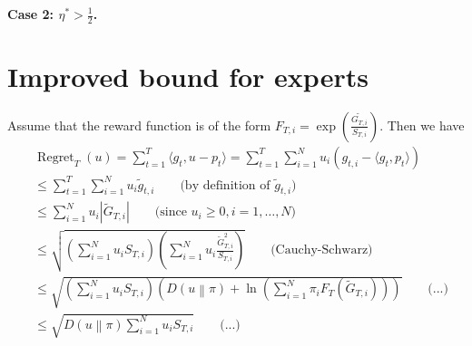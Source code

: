 \documentclass{colt2016_empty} %
\DeclareMathOperator{\Regret}{Regret}
\newcommand{\KL}[2]{D\left({#1}\middle\|{#2}\right)}  %
\begin{document}
\textbf{Case 2: $\eta^*>\frac{1}{2}$.}


\section{Improved bound for experts}

Assume that the reward function is of the form $F_{T,i}=\exp(\frac{\tilde{G_{T,i}}}{S_{T,i}})$. Then we have
\begin{align}
&\Regret_T(u)
= \sum_{t=1}^T \langle g_t, u - p_t \rangle
= \sum_{t=1}^T \sum_{i=1}^N u_i \left(g_{t,i} - \langle g_t, p_t \rangle \right) \\
& \le \sum_{t=1}^T \sum_{i=1}^N u_i \widetilde g_{t,i} \qquad \text{(by definition of $\widetilde g_{t,i}$)} \\
& \le \sum_{i=1}^N u_i \left|\widetilde G_{T,i}\right| \qquad \text{(since $u_i \ge 0, i=1,\ldots, N$)}  \\
& \le \sqrt{(\sum_{i=1}^N u_i S_{T,i}) (\sum_{i=1}^N u_i \frac{\widetilde G^2_{T,i}}{S_{T,i}})} \qquad \text{(Cauchy-Schwarz)}  \\
& \le \sqrt{(\sum_{i=1}^N u_i S_{T,i}) \left(\KL{u}{\pi}+\ln \left(\sum_{i=1}^N \pi_i F_T(\widetilde G_{T,i})\right)\right)} \qquad \text{(...)}  \\
& \le \sqrt{\KL{u}{\pi} \sum_{i=1}^N u_i S_{T,i}} \qquad \text{(...)}
\end{align}



\end{document}
